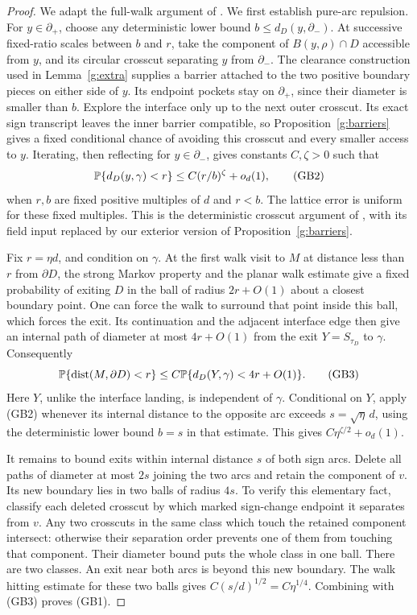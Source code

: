 \begin{proof}
We adapt the full-walk argument of \cite[Lemma~3.23, especially
equations (3.53) and (3.55)]{SSdiscrete}. We first establish pure-arc
repulsion. For \(y\in\partial_+\), choose
any deterministic lower bound \(b\leq d_D(y,\partial_-)\).
At successive fixed-ratio scales between \(b\) and \(r\), take
the component of \(B(y,\rho)\cap D\)
accessible from \(y\), and its circular crosscut separating \(y\)
from \(\partial_-\). The clearance construction used in
Lemma~\ref{g:extra} supplies a barrier attached to the two positive
boundary pieces on either side of \(y\). Its endpoint pockets stay
on \(\partial_+\), since their diameter is smaller than \(b\).
Explore the interface only up to the next outer crosscut. Its exact
sign transcript leaves the inner barrier compatible, so
Proposition~\ref{g:barriers} gives a fixed conditional chance of
avoiding this crosscut and every smaller access to \(y\).
Iterating, then reflecting for \(y\in\partial_-\), gives constants
\(C,\zeta>0\) such that
\[
 \mathbb P\{d_D(y,\gamma)<r\}
 \leq C(r/b)^\zeta+o_d(1),                         \tag{GB2}
\]
when \(r,b\) are fixed positive multiples of \(d\) and \(r<b\).
The lattice error is uniform for these fixed multiples. This is the
deterministic crosscut argument of
\cite[Theorem 3.22]{SSdiscrete}, with its field input replaced by
our exterior version of Proposition~\ref{g:barriers}.

Fix \(r=\eta d\), and condition on \(\gamma\). At the first walk
visit to \(M\) at distance less than \(r\) from \(\partial D\),
the strong Markov property and the planar walk estimate give a
fixed probability of exiting \(D\) in the ball of radius \(2r+O(1)\)
about a closest boundary point. One can force the walk to surround
that point inside this ball, which forces the exit. Its continuation
and the adjacent interface edge then give an internal path of diameter
at most \(4r+O(1)\) from the exit \(Y=S_{\tau_D}\) to \(\gamma\).
Consequently
\[
 \mathbb P\{\operatorname{dist}(M,\partial D)<r\}
 \leq C\mathbb P\{d_D(Y,\gamma)<4r+O(1)\}.             \tag{GB3}
\]
Here \(Y\), unlike the interface landing, is independent of
\(\gamma\). Conditional on \(Y\), apply (GB2) whenever its internal
distance to the opposite arc exceeds \(s=\sqrt\eta\,d\), using
the deterministic lower bound \(b=s\) in that estimate. This gives
\(C\eta^{\zeta/2}+o_d(1)\).

It remains to bound exits within internal distance \(s\) of both
sign arcs. Delete all paths of diameter at most \(2s\) joining the
two arcs and retain the component of \(v\). Its new boundary lies
in two balls of radius \(4s\). To verify this elementary fact,
classify each deleted crosscut by which marked sign-change endpoint
it separates from \(v\). Any two crosscuts in the same class which
touch the retained component intersect: otherwise their separation
order prevents one of them from touching that component. Their
diameter bound puts the whole class in one ball. There are two
classes. An exit near both arcs is beyond this new boundary.
The walk hitting estimate for these two balls gives
\(C(s/d)^{1/2}=C\eta^{1/4}\). Combining with (GB3) proves (GB1).


\end{proof}
